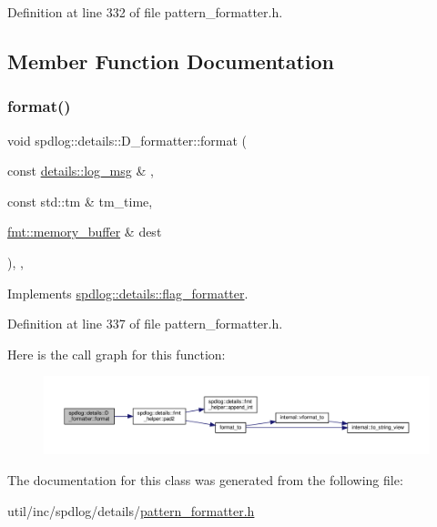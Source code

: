Definition at line 332 of file pattern\+\_\+formatter.\+h.



\subsection{Member Function Documentation}
\mbox{\label{classspdlog_1_1details_1_1_d__formatter_a065cf427de180dfee0b6abb642a78cb0}} 
\subsubsection{\texorpdfstring{format()}{format()}}
{\footnotesize\ttfamily void spdlog\+::details\+::\+D\+\_\+formatter\+::format (\begin{DoxyParamCaption}\item[{const \hyperlink{structspdlog_1_1details_1_1log__msg}{details\+::log\+\_\+msg} \&}]{,  }\item[{const std\+::tm \&}]{tm\+\_\+time,  }\item[{\hyperlink{format_8h_a21cbf729f69302f578e6db21c5e9e0d2}{fmt\+::memory\+\_\+buffer} \&}]{dest }\end{DoxyParamCaption})\hspace{0.3cm}{\ttfamily [inline]}, {\ttfamily [override]}, {\ttfamily [virtual]}}



Implements \hyperlink{classspdlog_1_1details_1_1flag__formatter_a33fb3e42a4c8200cceb833d92b53fb67}{spdlog\+::details\+::flag\+\_\+formatter}.



Definition at line 337 of file pattern\+\_\+formatter.\+h.

Here is the call graph for this function\+:
\nopagebreak
\begin{figure}[H]
\begin{center}
\leavevmode
\includegraphics[width=350pt]{classspdlog_1_1details_1_1_d__formatter_a065cf427de180dfee0b6abb642a78cb0_cgraph}
\end{center}
\end{figure}


The documentation for this class was generated from the following file\+:\begin{DoxyCompactItemize}
\item 
util/inc/spdlog/details/\hyperlink{pattern__formatter_8h}{pattern\+\_\+formatter.\+h}\end{DoxyCompactItemize}
